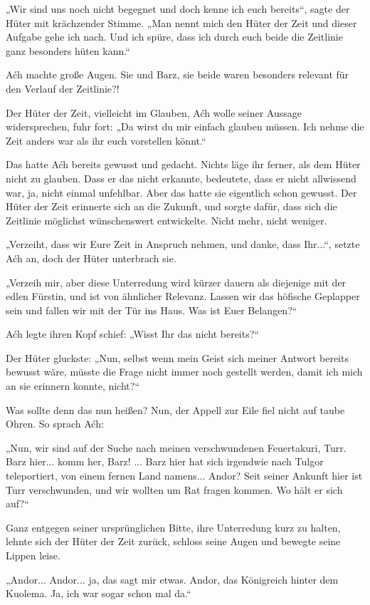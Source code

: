 „Wir sind uns noch nicht begegnet und doch kenne ich euch bereits“, sagte der Hüter mit krächzender Stimme. „Man nennt mich den Hüter der Zeit und dieser Aufgabe gehe ich nach. Und ich spüre, dass ich durch euch beide die Zeitlinie ganz besonders hüten kann.“

Aćh machte große Augen. Sie und Barz, sie beide waren besonders relevant für den Verlauf der Zeitlinie?!

Der Hüter der Zeit, vielleicht im Glauben, Aćh wolle seiner Aussage widersprechen, fuhr fort: „Da wirst du mir einfach glauben müssen. Ich nehme die Zeit anders war als ihr euch vorstellen könnt.“

Das hatte Aćh bereits gewusst und gedacht. Nichts läge ihr ferner, als dem Hüter nicht zu glauben. Dass er das nicht erkannte, bedeutete, dass er nicht allwissend war, ja, nicht einmal unfehlbar. Aber das hatte sie eigentlich schon gewusst. Der Hüter der Zeit erinnerte sich an die Zukunft, und sorgte dafür, dass sich die Zeitlinie möglichst wünschenswert entwickelte. Nicht mehr, nicht weniger.

„Verzeiht, dass wir Eure Zeit in Anspruch nehmen, und danke, dass Ihr...“, setzte Aćh an, doch der Hüter unterbrach sie.

„Verzeih mir, aber diese Unterredung wird kürzer dauern als diejenige mit der edlen Fürstin, und ist von ähnlicher Relevanz. Lassen wir das höfische Geplapper sein und fallen wir mit der Tür ins Haus. Was ist Euer Belangen?“

Aćh legte ihren Kopf schief: „Wisst Ihr das nicht bereits?“

Der Hüter gluckste: „Nun, selbst wenn mein Geist sich meiner Antwort bereits bewusst wäre, müsste die Frage nicht immer noch gestellt werden, damit ich mich an sie erinnern konnte, nicht?“

Was sollte denn das nun heißen? Nun, der Appell zur Eile fiel nicht auf taube Ohren. So sprach Aćh:

„Nun, wir sind auf der Suche nach meinen verschwundenen Feuertakuri, Turr. Barz hier... komm her, Barz! ... Barz hier hat sich irgendwie nach Tulgor teleportiert, von einem fernen Land namens... Andor? Seit seiner Ankunft hier ist Turr verschwunden, und wir wollten um Rat fragen kommen. Wo hält er sich auf?“

Ganz entgegen seiner ursprünglichen Bitte, ihre Unterredung kurz zu halten, lehnte sich der Hüter der Zeit zurück, schloss seine Augen und bewegte seine Lippen leise.

„Andor... Andor... ja, das sagt mir etwas. Andor, das Königreich hinter dem Kuolema. Ja, ich war sogar schon mal da.“

